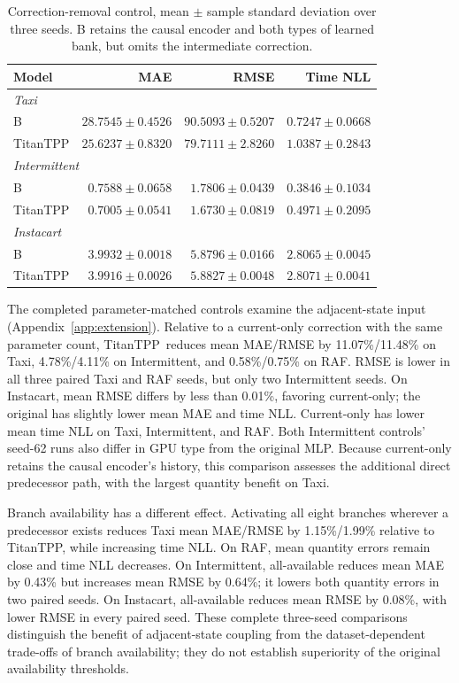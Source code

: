 \documentclass[runningheads]{llncs}
\newcommand{\method}{TitanTPP}
\begin{document}
\begin{table}[t]
\caption{Correction-removal control, mean $\pm$ sample standard deviation
over three seeds. B retains the causal encoder and both types of learned
bank, but omits the intermediate correction.}
\label{tab:ablation}\centering\small
\begin{tabular}{lrrr}
\toprule
Model & MAE & RMSE & Time NLL\\
\midrule
\multicolumn{4}{l}{\textit{Taxi}}\\
B & $28.7545\pm0.4526$ & $90.5093\pm0.5207$ & $0.7247\pm0.0668$\\
TitanTPP & $25.6237\pm0.8320$ & $79.7111\pm2.8260$ & $1.0387\pm0.2843$\\
\midrule
\multicolumn{4}{l}{\textit{Intermittent}}\\
B & $0.7588\pm0.0658$ & $1.7806\pm0.0439$ & $0.3846\pm0.1034$\\
TitanTPP & $0.7005\pm0.0541$ & $1.6730\pm0.0819$ & $0.4971\pm0.2095$\\
\midrule
\multicolumn{4}{l}{\textit{Instacart}}\\
B & $3.9932\pm0.0018$ & $5.8796\pm0.0166$ & $2.8065\pm0.0045$\\
TitanTPP & $3.9916\pm0.0026$ & $5.8827\pm0.0048$ & $2.8071\pm0.0041$\\
\bottomrule
\end{tabular}
\end{table}

The completed parameter-matched controls examine the adjacent-state input
(Appendix~\ref{app:extension}). Relative to a current-only correction with
the same parameter count, \method\ reduces mean MAE/RMSE by
11.07\%/11.48\% on Taxi, 4.78\%/4.11\% on Intermittent, and
0.58\%/0.75\% on RAF. RMSE is lower in all three paired Taxi and RAF
seeds, but only two Intermittent seeds. On Instacart, mean RMSE differs by
less than 0.01\%, favoring current-only; the original has slightly lower
mean MAE and time NLL. Current-only has lower mean time NLL on Taxi,
Intermittent, and RAF. Both Intermittent controls' seed-62 runs also differ
in GPU type from the original MLP. Because current-only retains the causal
encoder's history, this comparison assesses the additional direct predecessor
path, with the largest quantity benefit on Taxi.

Branch availability has a different effect. Activating all eight branches
wherever a predecessor exists reduces Taxi mean MAE/RMSE by 1.15\%/1.99\%
relative to \method, while increasing time NLL. On RAF, mean quantity
errors remain close and time NLL decreases. On Intermittent, all-available
reduces mean MAE by 0.43\% but increases mean RMSE by 0.64\%; it lowers
both quantity errors in two paired seeds. On Instacart, all-available reduces
mean RMSE by 0.08\%, with lower RMSE in every paired seed. These complete
three-seed comparisons distinguish the benefit of adjacent-state coupling
from the dataset-dependent trade-offs of branch availability; they do not
establish superiority of the original availability thresholds.
\end{document}
